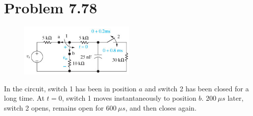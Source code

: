 \documentclass[12pt]{article}
\begin{document}
    \section*{Problem 7.78}
    \begin{figure}[h]
        \centering
        \includegraphics[width=0.5\textwidth]{7.78 Figure.png}
    \end{figure}
    \par In the circuit, switch 1 has been in position $ a $ and switch 2 has been closed for a long time. At $ t =  0 $, switch 1 moves instantaneously to position $ b $. $ 200\ \mu s $ later, switch 2 opens, remains open for $ 600\ \mu s $, and then closes again.
\end{document}
